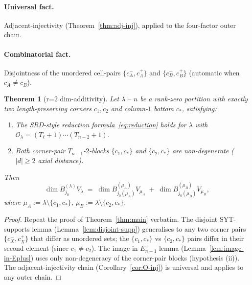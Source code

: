 \documentclass[11pt]{article}
\newtheorem{theorem}{Theorem}
\theoremstyle{definition}
\begin{document}
\paragraph{Universal fact.} Adjacent-injectivity
(Theorem~\ref{thm:adj-inj}), applied to the four-factor outer chain.

\paragraph{Combinatorial fact.}
Disjointness of the unordered cell-pairs $\{c_A^-, c_A^+\}$ and
$\{c_B^-, c_B^+\}$ (automatic when $c_A^- \ne c_B^-$).

\begin{theorem}[r=2 dim-additivity]\label{thm:r2-additivity}
Let $\lambda \vdash n$ be a rank-zero partition with exactly two
length-preserving corners $c_1, c_2$ and column-$1$ bottom $c_*$,
satisfying:
\begin{enumerate}[leftmargin=2em,topsep=0.2em,itemsep=0.1em]
\item The SRD-style reduction formula~\eqref{eq:reduction} holds
for $\lambda$ with $\mathcal{O}_\lambda = (T_\ell{+}1)\cdots(T_{n-2}{+}1)$.
\item Both corner-pair $T_{n-1}$-$2$-blocks $\{c_1, c_*\}$ and
$\{c_2, c_*\}$ are non-degenerate ($|d| \ge 2$ axial distance).
\end{enumerate}
Then
\[
   \dim B^{(\lambda)}_{j_0} V_\lambda
   \;=\;
   \dim B^{(\mu_A)}_{j_0(\mu_A)} V_{\mu_A}
   \;+\;
   \dim B^{(\mu_B)}_{j_0(\mu_B)} V_{\mu_B},
\]
where $\mu_A := \lambda \setminus \{c_1, c_*\}$,
$\mu_B := \lambda \setminus \{c_2, c_*\}$.
\end{theorem}

\begin{proof}
Repeat the proof of Theorem~\ref{thm:main} verbatim. The disjoint
SYT-supports lemma (Lemma~\ref{lem:disjoint-supp}) generalises to any
two corner pairs $\{c_X^-, c_X^+\}$ that differ as unordered sets;
the $\{c_1, c_*\}$ vs $\{c_2, c_*\}$ pairs differ in their second
element (since $c_1 \ne c_2$). The image-in-$E_{n-1}^+$ lemma
(Lemma~\ref{lem:image-in-Eplus}) uses only non-degeneracy of the
corner-pair blocks (hypothesis (ii)). The adjacent-injectivity
chain (Corollary~\ref{cor:O-inj}) is universal and applies to any
outer chain.
\end{proof}
\end{document}
